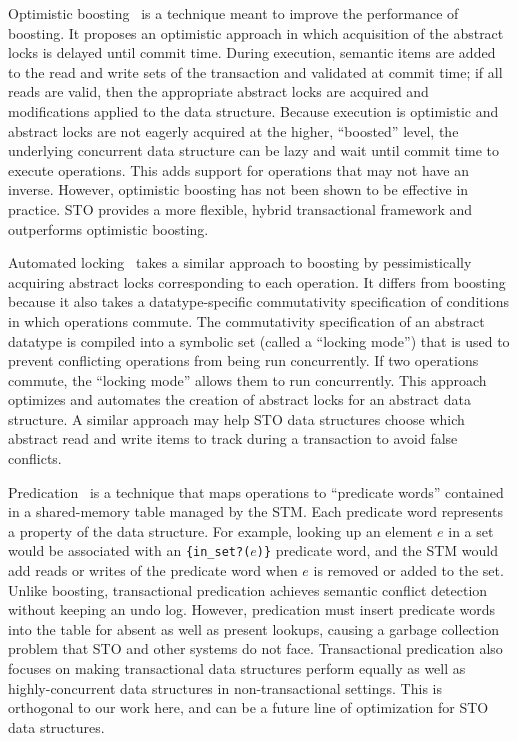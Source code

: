 Optimistic boosting~\cite{optboost} is a technique meant to improve the performance of boosting. It proposes an optimistic approach in which acquisition of the abstract locks is delayed until commit time. During execution, semantic items are added to the read and write sets of the transaction and validated at commit time; if all reads are valid, then the appropriate abstract locks are acquired and modifications applied to the data structure. Because execution is optimistic and abstract locks are not eagerly acquired at the higher, ``boosted'' level, the underlying concurrent data structure can be lazy and wait until commit time to execute operations. This adds support for operations that may not have an inverse. 
However, optimistic boosting has not been shown to be effective in practice. STO provides a more flexible, hybrid transactional framework and outperforms optimistic boosting.

Automated locking~\cite{autolock} takes a similar approach to boosting by pessimistically acquiring abstract locks corresponding to each operation. It differs from boosting because it also takes a datatype-specific commutativity specification of conditions in which operations commute. The commutativity specification of an abstract datatype is compiled into a symbolic set (called a ``locking mode'') that is used to prevent conflicting operations from being run concurrently. If two operations commute, the ``locking mode'' allows them to run concurrently.
This approach optimizes and automates the creation of abstract locks for an abstract data structure. A similar approach may help STO data structures choose which abstract read and write items to track during a transaction to avoid false conflicts.

Predication~\cite{predication} is a technique that maps operations to ``predicate words'' contained in a shared-memory table managed by the STM. Each predicate word represents a property of the data structure. For example, looking up an element $e$ in a set would be associated with an \texttt{\{in\_set?($e$)\}} predicate word, and the STM would add reads or writes of the predicate word when $e$ is removed or added to the set. 
Unlike boosting, transactional predication achieves semantic conflict detection without keeping an undo log. However, predication must insert predicate words into the table for absent as well as present lookups, causing a garbage collection problem that STO and other systems do not face. Transactional predication also focuses on making transactional data structures perform equally as well as highly-concurrent data structures in non-transactional settings. This is orthogonal to our work here, and can be a future line of optimization for STO data structures.

